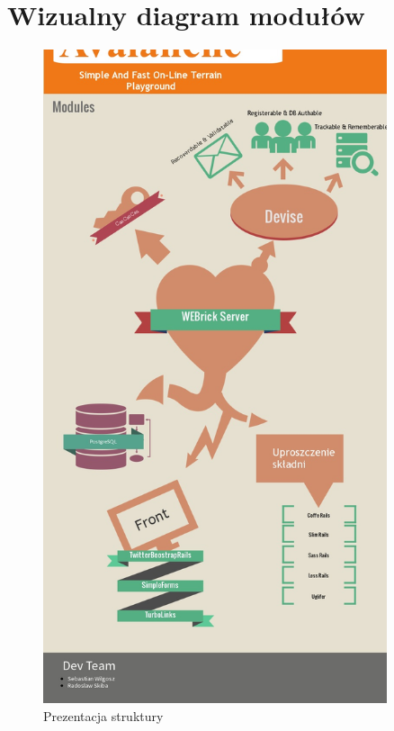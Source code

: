 \section{Wizualny diagram modułów}
\begin{center}

\begin{figure}
\includegraphics[width=0.90\textwidth,height=0.94\textheight]{img/info.jpg}
\caption{Prezentacja struktury}
\end{figure}

\end{center}